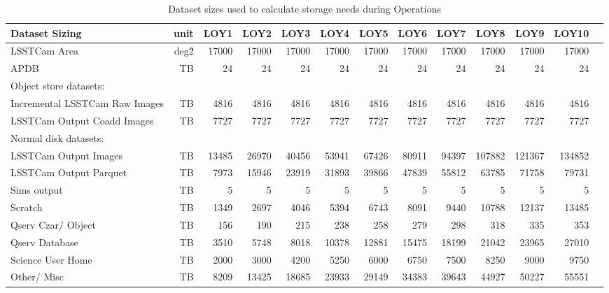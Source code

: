 \tiny \begin{longtable} { |p{}  |r  |r  |r  |r  |r  |r  |r  |r  |r  |r  |r  |r |} 
\caption{Dataset sizes used to calculate storage needs during Operations \label{tab:datasetSizingOps}}\\ 
\hline 
\textbf{Dataset Sizing}&\textbf{unit}&\textbf{LOY1}&\textbf{LOY2}&\textbf{LOY3}&\textbf{LOY4}&\textbf{LOY5}&\textbf{LOY6}&\textbf{LOY7}&\textbf{LOY8}&\textbf{LOY9}&\textbf{LOY10} \\ \hline
{LSSTCam Area}&{deg\^2}&{17000}&{17000}&{17000}&{17000}&{17000}&{17000}&{17000}&{17000}&{17000}&{17000} \\ \hline
{APDB}&{TB}&{24}&{24}&{24}&{24}&{24}&{24}&{24}&{24}&{24}&{24} \\ \hline
{Object store datasets:}&&&&&&&&&&& \\ \hline
{Incremental LSSTCam Raw Images}&{TB}&{4816}&{4816}&{4816}&{4816}&{4816}&{4816}&{4816}&{4816}&{4816}&{4816} \\ \hline
{LSSTCam Output Coadd Images}&{TB}&{7727}&{7727}&{7727}&{7727}&{7727}&{7727}&{7727}&{7727}&{7727}&{7727} \\ \hline
{Normal disk datasets:}&&&&&&&&&&& \\ \hline
{LSSTCam Output Images}&{TB}&{13485}&{26970}&{40456}&{53941}&{67426}&{80911}&{94397}&{107882}&{121367}&{134852} \\ \hline
{LSSTCam Output Parquet}&{TB}&{7973}&{15946}&{23919}&{31893}&{39866}&{47839}&{55812}&{63785}&{71758}&{79731} \\ \hline
{Sims output}&{TB}&{5}&{5}&{5}&{5}&{5}&{5}&{5}&{5}&{5}&{5} \\ \hline
{Scratch}&{TB}&{1349}&{2697}&{4046}&{5394}&{6743}&{8091}&{9440}&{10788}&{12137}&{13485} \\ \hline
{Qserv Czar/ Object}&{TB}&{156}&{190}&{215}&{238}&{258}&{279}&{298}&{318}&{335}&{353} \\ \hline
{Qserv Database}&{TB}&{3510}&{5748}&{8018}&{10378}&{12881}&{15475}&{18199}&{21042}&{23965}&{27010} \\ \hline
{Science User Home}&{TB}&{2000}&{3000}&{4200}&{5250}&{6000}&{6750}&{7500}&{8250}&{9000}&{9750} \\ \hline
{Other/ Misc}&{TB}&{8209}&{13425}&{18685}&{23933}&{29149}&{34383}&{39643}&{44927}&{50227}&{55551} \\ \hline
\end{longtable} \normalsize
